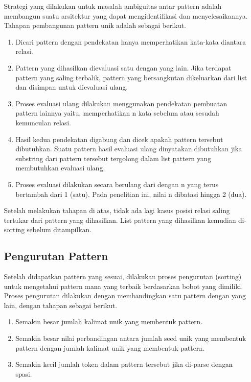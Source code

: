 Strategi yang dilakukan untuk masalah ambiguitas antar pattern adalah membangun suatu arsitektur yang dapat mengidentifikasi dan menyelesaikannya. Tahapan pembangunan pattern unik adalah sebagai berikut.
\begin{enumerate}
  \item Dicari pattern dengan pendekatan hanya memperhatikan kata-kata diantara relasi.
  \item Pattern yang dihasilkan dievaluasi satu dengan yang lain. Jika terdapat pattern yang saling terbalik, pattern yang bersangkutan dikeluarkan dari list dan disimpan untuk dievaluasi ulang.
  \item Proses evaluasi ulang dilakukan menggunakan pendekatan pembuatan pattern lainnya yaitu, memperhatikan n kata sebelum atau sesudah kemunculan relasi.
  \item Hasil kedua pendekatan digabung dan dicek apakah pattern tersebut dibutuhkan. Suatu pattern hasil evaluasi ulang dinyatakan dibutuhkan jika substring dari pattern tersebut tergolong dalam list pattern yang membutuhkan evaluasi ulang.
  \item Proses evaluasi dilakukan secara berulang dari dengan n yang terus bertambah dari 1 (satu). Pada penelitian ini, nilai n dibatasi hingga 2 (dua).
\end{enumerate}

Setelah melakukan tahapan di atas, tidak ada lagi kasus posisi relasi saling tertukar dari pattern yang dihasilkan. List pattern yang dihasilkan kemudian di-sorting sebelum ditampilkan.

\subsection{Pengurutan Pattern}
Setelah didapatkan pattern yang sesuai, dilakukan proses pengurutan (sorting) untuk mengetahui pattern mana yang terbaik berdasarkan bobot yang dimiliki. Proses pengurutan dilakukan dengan membandingkan satu pattern dengan yang lain, dengan tahapan sebagai berikut.
\begin{enumerate}
  \item Semakin besar jumlah kalimat unik yang membentuk pattern.
  \item Semakin besar nilai perbandingan antara jumlah seed unik yang membentuk pattern dengan jumlah kalimat unik yang membentuk pattern.
  \item Semakin kecil jumlah token dalam pattern tersebut jika di-parse dengan spasi.
\end{enumerate}

